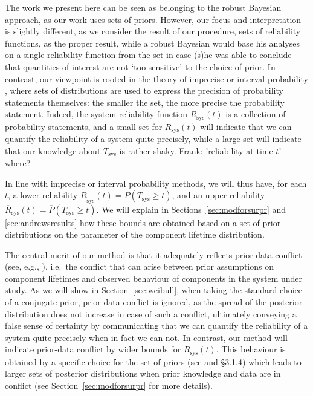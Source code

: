 \documentclass[12pt,a4paper,twocolumn,fleqn]{narms}
\newcommand{\ul}[1]{\underline{#1}}
\newcommand{\ol}[1]{\overline{#1}}
\newcommand{\lRsys}{\ul{R}_\text{sys}}
\newcommand{\uRsys}{\ol{R}_\text{sys}}
\newcommand{\comments}[1]{{\small\color{gray} #1}}
\begin{document}
The work we present here can be seen as belonging to the robust Bayesian approach,
as our work uses sets of priors. However, our focus and interpretation is slightly different,
as we consider the result of our procedure, sets of reliability functions, as the proper result,
while a robust Bayesian would base his analyses on a single reliability function from the set
in case (s)he was able to conclude that quantities of interest are not `too sensitive' to the choice of prior.
In contrast, our viewpoint is rooted in the theory of imprecise or interval probability \cite{1991:walley,itip},
where sets of distributions are used to express the precision of probability statements themselves:
the smaller the set, the more precise the probability statement.
Indeed, the system reliability function $R_\text{sys}(t)$ is a collection of probability statements,
and a small set for $R_\text{sys}(t)$ will indicate that we can quantify the reliability of a system quite precisely,
while a large set will indicate that our knowledge about $T_\text{sys}$ is rather shaky.
\comments{Frank: 'reliability at time $t$' where?}

In line with imprecise or interval probability methods, we will thus have, for each $t$,
a lower reliability $\lRsys(t) = \ul{P}(T_\text{sys} \geq t)$,
and an upper reliability $\uRsys(t) = \ol{P}(T_\text{sys} \geq t)$.
We will explain in Sections~\ref{sec:modforsurpr} and \ref{sec:andrewsresults} how these bounds are obtained
based on a set of prior distributions on the parameter of the component lifetime distribution.

The central merit of our method is that it adequately reflects prior-data conflict
(see, e.g., ),
i.e.\ the conflict that can arise between prior assumptions on component lifetimes
and observed behaviour of components in the system under study.
As we will show in Section~\ref{sec:weibull}, when taking the standard choice of a conjugate prior,
prior-data conflict is ignored, as the spread of the posterior distribution does not increase in case of such a conflict,
ultimately conveying a false sense of certainty
by communicating that we can quantify the reliability of a system quite precisely when in fact we can not.
%
In contrast, our method will indicate prior-data conflict by wider bounds for $R_\text{sys}(t)$.
This behaviour is obtained by a specific choice for the set of priors (see  and  \S 3.1.4)
which leads to larger sets of posterior distributions when prior knowledge and data are in conflict
(see Section~\ref{sec:modforsurpr} for more details).
\end{document}
